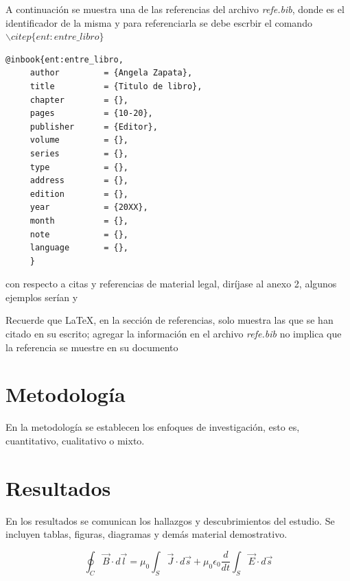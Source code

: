 A continuación se muestra una de las referencias del archivo \textit{refe.bib}, donde  es el identificador de la misma y para referenciarla se debe escrbir el comando $\backslash citep\{ent:entre\_libro\}$ 

\newpage
\begin{verbatim}
@inbook{ent:entre_libro,
     author         = {Angela Zapata},
     title          = {Titulo de libro},
     chapter        = {},
     pages          = {10-20},
     publisher      = {Editor},
     volume         = {},
     series	        = {},
     type           = {},
     address        = {},
     edition        = {},
     year           = {20XX},
     month          = {},
     note           = {},
     language       = {},
     }
\end{verbatim}

con respecto a citas y referencias de material legal, diríjase al anexo 2, algunos ejemplos serían  y            

Recuerde que \LaTeX , en la sección de referencias, solo muestra las que se han citado en su escrito; agregar la información en el archivo \textit{refe.bib} no implica que la referencia se muestre en su documento




\newpage
\section{Metodología}

En la metodología se establecen los enfoques de investigación, esto es, cuantitativo, cualitativo o mixto.

\newpage
\section{Resultados}

En los resultados se comunican los hallazgos y descubrimientos del estudio. Se incluyen tablas, figuras, diagramas y demás material demostrativo.


\begin{equation}
    \oint_C \vec{B}\cdot d \vec{l}=\mu_0\int_S \vec{J}\cdot d \vec{s}+\mu_0\epsilon_0\dfrac{d }{d t}\int_S \vec{E}\cdot d \vec{s}
\end{equation}

